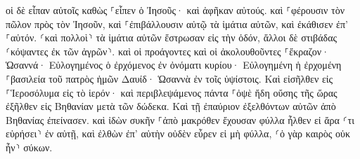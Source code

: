 \documentclass{openreader}
\begin{document}
οἱ δὲ εἶπαν αὐτοῖς καθὼς ⸀εἶπεν ὁ Ἰησοῦς· καὶ ἀφῆκαν αὐτούς. 
καὶ ⸀φέρουσιν τὸν πῶλον πρὸς τὸν Ἰησοῦν, καὶ ⸀ἐπιβάλλουσιν αὐτῷ τὰ ἱμάτια αὐτῶν, καὶ ἐκάθισεν ἐπ’ ⸀αὐτόν. 
⸂καὶ πολλοὶ⸃ τὰ ἱμάτια αὐτῶν ἔστρωσαν εἰς τὴν ὁδόν, ἄλλοι δὲ στιβάδας ⸂κόψαντες ἐκ τῶν ἀγρῶν⸃. 
καὶ οἱ προάγοντες καὶ οἱ ἀκολουθοῦντες ⸀ἔκραζον· Ὡσαννά· Εὐλογημένος ὁ ἐρχόμενος ἐν ὀνόματι κυρίου· 
Εὐλογημένη ἡ ἐρχομένη ⸀βασιλεία τοῦ πατρὸς ἡμῶν Δαυίδ· Ὡσαννὰ ἐν τοῖς ὑψίστοις. 
Καὶ εἰσῆλθεν εἰς ⸀Ἱεροσόλυμα εἰς τὸ ἱερόν· καὶ περιβλεψάμενος πάντα ⸀ὀψὲ ἤδη οὔσης τῆς ὥρας ἐξῆλθεν εἰς Βηθανίαν μετὰ τῶν δώδεκα. 
Καὶ τῇ ἐπαύριον ἐξελθόντων αὐτῶν ἀπὸ Βηθανίας ἐπείνασεν. 
καὶ ἰδὼν συκῆν ⸀ἀπὸ μακρόθεν ἔχουσαν φύλλα ἦλθεν εἰ ἄρα ⸂τι εὑρήσει⸃ ἐν αὐτῇ, καὶ ἐλθὼν ἐπ’ αὐτὴν οὐδὲν εὗρεν εἰ μὴ φύλλα, ⸂ὁ γὰρ καιρὸς οὐκ ἦν⸃ σύκων. 
\end{document}
